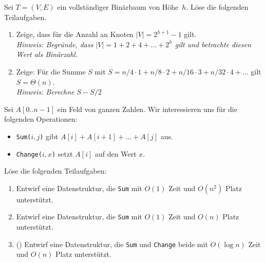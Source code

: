 \documentclass{uebung_cs}
\begin{document}
\begin{aufgabe}
	Sei $T = (V,E)$ ein vollständiger Binärbaum von Höhe~$h$.
	Löse die folgenden Teilaufgaben.
	\begin{enumerate}
		\item Zeige, dass für die Anzahl an Knoten $|V| = 2^{h+1} - 1$ gilt.\\
		\textit{Hinweis: Begründe, dass $|V| = 1 + 2 + 4 + \hdots + 2^h$ gilt und betrachte diesen Wert als Binärzahl.}
		\item Zeige: Für die Summe $S$ mit $S = n / 4 \cdot 1 + n / 8 \cdot 2 + n / 16 \cdot 3 + n / 32 \cdot 4 + \hdots$ gilt $S = \Theta(n)$.\\
		\textit{Hinweis: Berechne $S - S/2$}
	\end{enumerate}
\end{aufgabe}


\begin{aufgabe}[Summen]
	Sei $A[0..n-1]$ ein Feld von ganzen Zahlen.
	Wir interessieren uns für die folgenden Operationen:
	\begin{itemize}
		\item \texttt{Sum($i,j$)} gibt $A[i] + A[i+1] + \hdots + A[j]$ aus.
		\item \texttt{Change($i,x$)} setzt $A[i]$ auf den Wert $x$.
	\end{itemize}
	Löse die folgenden Teilaufgaben:
	\begin{enumerate}
		\item \bestehen %
    Entwirf eine Datenstruktur, die \texttt{Sum} mit $O(1)$ Zeit und $O(n^2)$ Platz unterstützt.
		\item \note %
    Entwirf eine Datenstruktur, die \texttt{Sum} mit $O(1)$ Zeit und $O(n)$ Platz unterstützt.
		\item \note (\veryhard) Entwirf eine Datenstruktur, die \texttt{Sum} und \texttt{Change} beide mit $O(\log n)$ Zeit und $O(n)$ Platz unterstützt.
	\end{enumerate}
\end{aufgabe}
\end{document}
